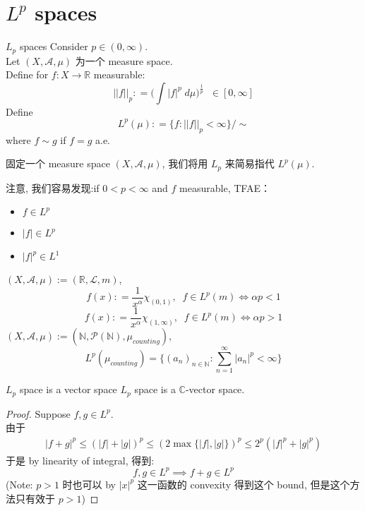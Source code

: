 \documentclass[lang=cn,11pt]{elegantbook}
\begin{document}
\section{$L^p$ spaces}
\begin{definition}{$L_p$ spaces}
    Consider $p\in(0,\infty)$.\\
    Let $(X,\mathcal{A},\mu)$ 为一个 measure space.\\
    Define for $f: X \to \mathbb{R}$ measurable: \[
    ||f||_p : = \Big(\int |f|^p \; d\mu  \Big)^{\frac{1}{p}} \;\; \in [0,\infty]
    \]
    Define \[
    L^p(\mu) : = \{ f :  ||f||_p  < \infty \} / \sim
    \] where $f \sim g$ if $f=g$ a.e.
\end{definition}
固定一个 measure space $(X,\mathcal{A},\mu)$, 我们将用 $L_p$ 来简易指代 $ L^p(\mu)$.\\
\begin{remark}
    注意, 我们容易发现:if $ 0<p< \infty$ and $f$ measurable, TFAE：
\begin{itemize}
    \item $f \in L^p$
    \item $|f| \in L^p$
    \item $|f|^p \in L^1$
\end{itemize}
\end{remark}

\begin{example}
    $(X,\mathcal{A},\mu) := (\mathbb{R},\mathcal{L}, m)$, \[
    f(x) : = \frac{1}{x^\alpha} \chi_{(0,1)}, \;\; f\in L^p(m) \Longleftrightarrow   \alpha p < 1
    \]  \[
    f(x) : = \frac{1}{x^\alpha} \chi_{(1,\infty)}, \;\; f\in L^p(m) \Longleftrightarrow   \alpha p > 1
    \]
    $(X,\mathcal{A},\mu) := (\mathbb{N},\mathcal{P}(\mathbb{N}), \mu_{counting})$, \[
    L^p( \mu_{counting}) = \{ (a_n)_{n\in\mathbb{N}} : \sum_{n=1}^\infty |a_n|^p < \infty   \}
    \]
\end{example}

\begin{lemma}{$L_p$ space is a vector space}
    $L_p$ space is a $\mathbb{C}$-vector space.
\end{lemma}
\begin{proof}
 Suppose $f, g\in L^p $.\\
由于 \begin{align}
        |f+ g|^p   \leq (|f| + |g| )^p \leq (2 \max\{|f|, |g|\})^p  \leq 2^p (|f|^p + |g|^p)
    \end{align}
于是 by linearity of integral, 得到:
$$f, g\in L^p \implies f+g \in L^p$$
(Note: $p>1$ 时也可以 by $|x|^p$ 这一函数的 convexity 得到这个 bound, 但是这个方法只有效于 $p>1$)
\end{proof}
\end{document}
